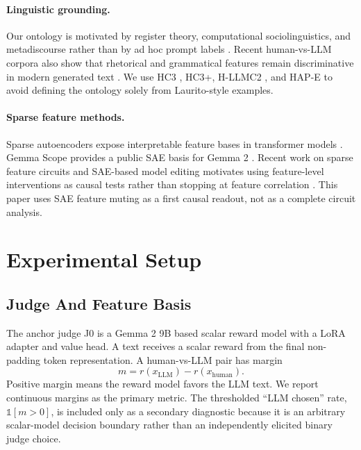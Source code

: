 \documentclass[11pt]{article}
\begin{document}
\paragraph{Linguistic grounding.}
Our ontology is motivated by register theory, computational sociolinguistics,
and metadiscourse rather than by ad hoc prompt labels
\citep{biber1993register,nguyen2016sociolinguistics,passonneau2014biberredux,
hyland2005metadiscourse}. Recent human-vs-LLM corpora also show that rhetorical
and grammatical features remain discriminative in modern generated text
\citep{reinhart2024llmshumans}. We use HC3 \citep{guo2023hc3}, HC3+, H-LLMC2
\citep{noepsl2025hllmc2}, and HAP-E \citep{browndw2024hape,
reinhart2024llmshumans} to avoid defining the ontology solely from Laurito-style
examples.

\paragraph{Sparse feature methods.}
Sparse autoencoders expose interpretable feature bases in transformer models
\citep{cunningham2023sae,gao2024scaling}. Gemma Scope provides a public SAE
basis for Gemma 2 \citep{lieberum2024gemmascope}. Recent work on sparse feature
circuits and SAE-based model editing motivates using feature-level interventions
as causal tests rather than stopping at feature correlation
\citep{marks2024sparsecircuits,dunefsky2024transcoders,kissane2024attention}.
This paper uses SAE feature muting as a first causal readout, not as a complete
circuit analysis.

\section{Experimental Setup}

\subsection{Judge And Feature Basis}

The anchor judge J0 is a Gemma 2 9B based scalar reward model with a LoRA
adapter and value head. A text receives a scalar reward from the final
non-padding token representation. A human-vs-LLM pair has margin
\[
  m = r(x_{\mathrm{LLM}}) - r(x_{\mathrm{human}}).
\]
Positive margin means the reward model favors the LLM text. We report
continuous margins as the primary metric. The thresholded ``LLM chosen'' rate,
\(\mathbb{1}[m > 0]\), is included only as a secondary diagnostic because it is
an arbitrary scalar-model decision boundary rather than an independently
elicited binary judge choice.
\end{document}
